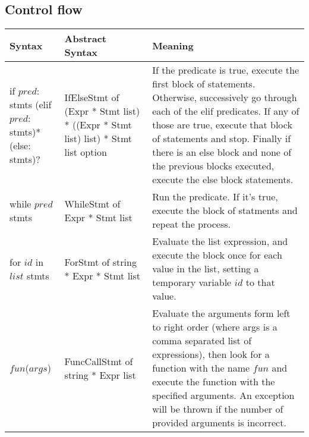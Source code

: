 \documentclass{article}
\begin{document}
\subsection{Control flow}
\begin{center}
 \begin{tabularx}{\linewidth}{|X|X|X|} 
 \hline
 Syntax & Abstract Syntax & Meaning \\
 \hline
 if $pred$: stmts (elif $pred$: stmts)* (else: stmts)? & IfElseStmt of (Expr * Stmt list) * ((Expr * Stmt list) list) * Stmt list option & If the predicate is true, execute the first block of statements. Otherwise, successively go through each of the elif predicates. If any of those are true, execute that block of statements and stop. Finally if there is an else block and none of the previous blocks executed, execute the else block statements. \\ 
 \hline
 while $pred$ stmts & WhileStmt of Expr * Stmt list & Run the predicate. If it's true, execute the block of statments and repeat the process. \\
 \hline
 for $id$ in $list$ stmts & ForStmt of string * Expr * Stmt list & Evaluate the list expression, and execute the block once for each value in the list, setting a temporary variable $id$ to that value. \\
 \hline
 $fun$($args$) & FuncCallStmt of string * Expr list & Evaluate the arguments form left to right order (where args is a comma separated list of expressions), then look for a function with the name $fun$ and execute the function with the specified arguments. An exception will be thrown if the number of provided arguments is incorrect. \\
 \hline
\end{tabularx}
\end{center}

\clearpage
\end{document}
